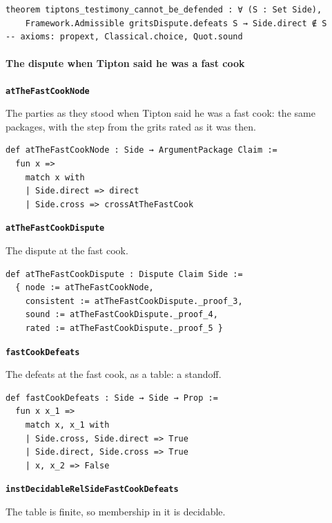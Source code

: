 \documentclass[11pt]{article}
\begin{document}
{\small\begin{verbatim}
theorem tiptons_testimony_cannot_be_defended : ∀ (S : Set Side),
    Framework.Admissible gritsDispute.defeats S → Side.direct ∉ S
-- axioms: propext, Classical.choice, Quot.sound
\end{verbatim}}
\paragraph*{The dispute when Tipton said he was a fast cook}
\leavevmode\par\nobreak
\par\medskip\noindent\textbf{\texttt{at\allowbreak{}The\allowbreak{}Fast\allowbreak{}Cook\allowbreak{}Node}}\par\nobreak\noindent
The parties as they stood when Tipton said he was a fast cook: the same packages, with the step from the grits rated as it was then.

{\small\begin{verbatim}
def atTheFastCookNode : Side → ArgumentPackage Claim :=
  fun x =>
    match x with
    | Side.direct => direct
    | Side.cross => crossAtTheFastCook
\end{verbatim}}
\par\medskip\noindent\textbf{\texttt{at\allowbreak{}The\allowbreak{}Fast\allowbreak{}Cook\allowbreak{}Dispute}}\par\nobreak\noindent
The dispute at the fast cook.

{\small\begin{verbatim}
def atTheFastCookDispute : Dispute Claim Side :=
  { node := atTheFastCookNode,
    consistent := atTheFastCookDispute._proof_3,
    sound := atTheFastCookDispute._proof_4,
    rated := atTheFastCookDispute._proof_5 }
\end{verbatim}}
\par\medskip\noindent\textbf{\texttt{fast\allowbreak{}Cook\allowbreak{}Defeats}}\par\nobreak\noindent
The defeats at the fast cook, as a table: a standoff.

{\small\begin{verbatim}
def fastCookDefeats : Side → Side → Prop :=
  fun x x_1 =>
    match x, x_1 with
    | Side.cross, Side.direct => True
    | Side.direct, Side.cross => True
    | x, x_2 => False
\end{verbatim}}
\par\medskip\noindent\textbf{\texttt{inst\allowbreak{}Decidable\allowbreak{}Rel\allowbreak{}Side\allowbreak{}Fast\allowbreak{}Cook\allowbreak{}Defeats}}\par\nobreak\noindent
The table is finite, so membership in it is decidable.
\end{document}
